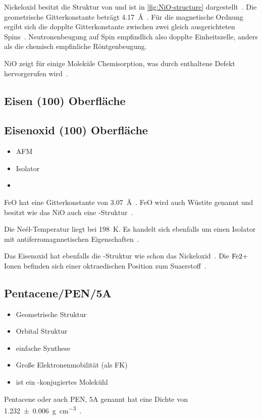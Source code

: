             Nickeloxid besitzt die Struktur von  und ist in \autoref{fig:NiO-structure} dargestellt~\cite{kunz_chemisorption_1985}. 
            Die geometrische Gitterkonstante beträgt \SI{4.17}{\angstrom}~\cite{sebbari_uranyl_2012}.
            Für die magnetische Ordnung ergibt sich die dopplte Gitterkonstante zwischen zwei gleich ausgerichteten Spins~\cite{Suter}.
            Neutronenbeugung auf Spin empfindlich also dopplte Einheitszelle, anders als die chemisch empfinliche Röntgenbeugung.

            NiO zeigt für einige Moleküle Chemisorption, was durch enthaltene Defekt hervorgerufen wird~\cite{kunz_chemisorption_1985}.
        
        \subsection{Eisen (100) Oberfläche}

        \subsection{Eisenoxid (100) Oberfläche}
            \begin{itemize}
                \item AFM
                \item Isolator
                \item 
            \end{itemize}
            FeO hat eine Gitterkonstante von \SI{3.07}{\angstrom}~\cite{FeO_1}.
            FeO wird auch Wüstite genannt und besitzt wie das NiO auch eine -Struktur~\cite{FeO_4}.

            Die Neél-Temperatur liegt bei \SI{198}{\kelvin}.
            Es handelt sich ebenfalls um einen Isolator mit antiferromagnnetischen Eigenschaften~\cite{FeO_4}.

            Das Eisenoxid hat ebenfalls die -Struktur wie schon das Nickeloxid~\cite{FeO_4}.
            Die $\ce{Fe{2+}}$ Ionen befinden sich einer oktraedischen Position zum Suaerstoff~\cite{FeO_4}.

        \subsection{Pentacene/PEN/5A}
            \begin{itemize}
                \item Geometrische Struktur
                \item Orbital Struktur
                \item einfache Synthese
                \item Große Elektronenmobilität (als FK)
                \item ist ein \pi-konjugiertes Molekühl \cite{MM_2}
            \end{itemize}
            Pentacene oder auch PEN, 5A genannt hat eine Dichte von \SI{1.232(6)}{\gram\per\cubic\centi\meter}~\cite{CAS}.

